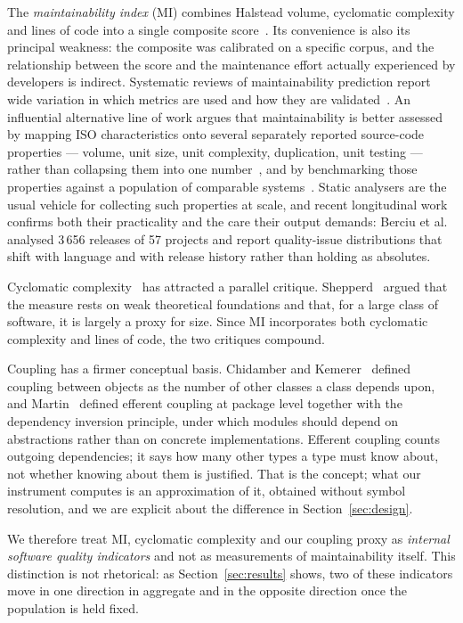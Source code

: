 \documentclass{sbc2019}%
\begin{document}
The \emph{maintainability index} (MI) combines Halstead volume, cyclomatic
complexity and lines of code into a single composite score~\cite{coleman1994}. Its convenience is also its principal weakness: the
composite was calibrated on a specific corpus, and the relationship between the
score and the maintenance effort actually experienced by developers is
indirect. Systematic reviews of maintainability prediction report wide
variation in which metrics are used and how they are validated~\cite{riaz2009,ardito2020}. An influential alternative line of work argues that
maintainability is better assessed by mapping ISO characteristics onto several
separately reported source-code properties --- volume, unit size, unit
complexity, duplication, unit testing --- rather than collapsing them into one
number~\cite{heitlager2007}, and by benchmarking those properties against a
population of comparable systems~\cite{baggen2012}. Static analysers are the
usual vehicle for collecting such properties at scale, and recent longitudinal
work confirms both their practicality and the care their output demands: Berciu
et al.\ \cite{berciu2026} analysed 3\,656 releases of 57 projects and report
quality-issue distributions that shift with language and with release history
rather than holding as absolutes.

Cyclomatic complexity~\cite{mccabe1976} has attracted a parallel critique.
Shepperd~\cite{shepperd1988} argued that the measure rests on weak theoretical
foundations and that, for a large class of software, it is largely a proxy for
size. Since MI incorporates both cyclomatic complexity and lines of code, the
two critiques compound.

Coupling has a firmer conceptual basis. Chidamber and Kemerer~\cite{chidamber1994} defined coupling between objects as the number of other
classes a class depends upon, and Martin~\cite{martin2003} defined efferent
coupling at package level together with the dependency inversion principle,
under which modules should depend on abstractions rather than on concrete
implementations. Efferent coupling counts outgoing dependencies; it says how
many other types a type must know about, not whether knowing about them is
justified. That is the concept; what our instrument computes is an
approximation of it, obtained without symbol resolution, and we are explicit
about the difference in Section~\ref{sec:design}.

We therefore treat MI, cyclomatic complexity and our coupling proxy as
\emph{internal software quality indicators} and not as measurements of
maintainability itself. This distinction is not rhetorical: as
Section~\ref{sec:results} shows, two of these indicators move in one direction
in aggregate and in the opposite direction once the population is held fixed.
\end{document}
